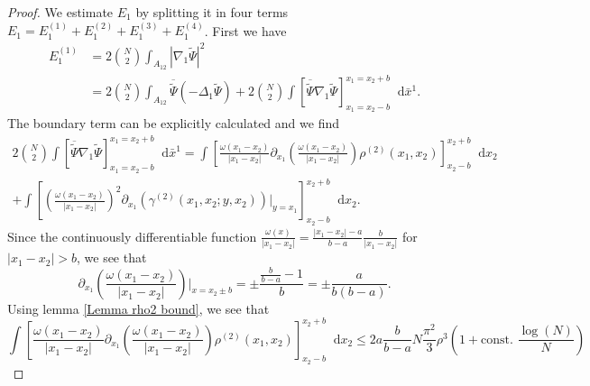 \documentclass[a4paper,11pt]{article}
\newcommand{\abs}[1]{\left\lvert #1 \right\rvert}
\newcommand*\diff{\mathop{}\!\mathrm{d}}
\numberwithin{equation}{section}
\begin{document}
		\begin{proof}
		We estimate $ E_1 $ by splitting it in four terms $ E_1=E_1^{(1)}+E_1^{(2)}+E_1^{(3)}+E_1^{(4)} $. First we have \begin{equation}
		\begin{aligned}
		E_1^{(1)}&=2\binom{N}{2}\int_{A_{12}}\abs{\nabla_1\tilde{\Psi}}^2\\&
		=2\binom{N}{2}\int_{A_{12}}\overline{\tilde{\Psi}}\left( -\Delta_1 \tilde{\Psi} \right)+2\binom{N}{2}\int\left[\overline{\tilde{\Psi}}\nabla_1\tilde{\Psi}\right]_{x_1=x_2-b}^{x_1=x_2+b}\diff \bar{x}^1.
		\end{aligned}
		\end{equation}
		The boundary term can be explicitly calculated and we find \begin{equation}
		\begin{aligned}
		2\binom{N}{2}\int\left[\overline{\tilde{\Psi}}\nabla_1\tilde{\Psi}\right]_{x_1=x_2-b}^{x_1=x_2+b}\diff \bar{x}^1=\int\left[\frac{\omega(x_1-x_2)}{\abs{x_1-x_2}}\partial_{x_1}\left(\frac{\omega(x_1-x_2)}{\abs{x_1-x_2}}\right)\rho^{(2)}(x_1,x_2)\right]_{x_2-b}^{x_2+b}\diff x_2\\+\int\left[\left(\frac{\omega(x_1-x_2)}{\abs{x_1-x_2}}\right)^2\partial_{x_1}\left(\gamma^{(2)}(x_1,x_2;y,x_2)\right)\bigg\vert_{y=x_1}\right]_{x_2-b}^{x_2+b}\diff x_2.
		\end{aligned}
		\end{equation}
		Since the continuously differentiable function $ \frac{\omega(x)}{\abs{x_1-x_2}}=\frac{\abs{x_1-x_2}-a}{b-a}\frac{b}{\abs{x_1-x_2}} $ for $ \abs{x_1-x_2}>b $, we see that \begin{equation}
		\partial_{x_1}\left(\frac{\omega(x_1-x_2)}{\abs{x_1-x_2}}\right)\bigg\vert_{x=x_2\pm b}=\pm \frac{\frac{b}{b-a}-1}{ b}=\pm\frac{a}{b(b-a)}.
		\end{equation}
		Using lemma \ref{Lemma rho2 bound}, we see that \begin{equation}
		\int\left[\frac{\omega(x_1-x_2)}{\abs{x_1-x_2}}\partial_{x_1}\left(\frac{\omega(x_1-x_2)}{\abs{x_1-x_2}}\right)\rho^{(2)}(x_1,x_2)\right]_{x_2-b}^{x_2+b}\diff x_2\leq 2a\frac{b}{b-a} N\frac{\pi^2}{3}\rho^3\left(1+\text{const. }\frac{\log(N)}{N}\right)
		\end{equation}
		

\end{proof}
\end{document}
